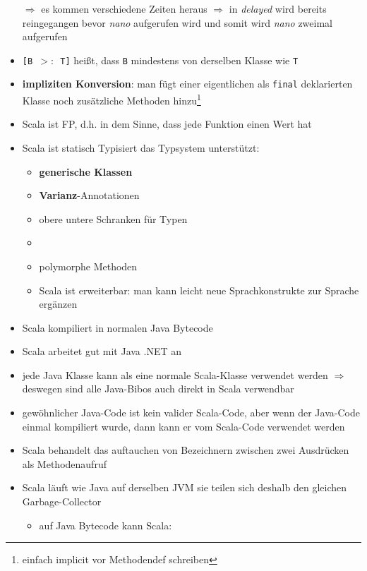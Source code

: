 \begin{itemize}
  
  
  $\Rightarrow$ es kommen verschiedene Zeiten heraus $\Rightarrow$ in
  \textit{delayed} wird bereits reingegangen bevor \textit{nano} 
  aufgerufen wird und somit wird \textit{nano} zweimal aufgerufen
  \item \texttt{[B $>:$ T]} heißt, dass \texttt{B} mindestens von derselben
  Klasse wie \texttt{T}
  \item \textbf{impliziten Konversion}: man fügt einer eigentlichen als 
  \texttt{final} deklarierten Klasse noch
  zusätzliche Methoden hinzu\footnote{einfach implicit vor Methodendef
  schreiben}
  \item Scala ist FP, d.h. in dem Sinne, dass jede Funktion einen Wert hat
  \item Scala ist statisch Typisiert \und das Typsystem unterstützt:
  \begin{itemize}
    \item \textbf{generische Klassen}
    \item \textbf{Varianz}-Annotationen
    \item obere \und untere Schranken für Typen
    \item {}
    \item polymorphe Methoden
    \item Scala ist erweiterbar: man kann leicht neue Sprachkonstrukte
    zur Sprache ergänzen
  \end{itemize}
  \item Scala kompiliert in normalen Java Bytecode
  \item Scala arbeitet gut mit Java \und .NET an
  \item jede Java Klasse kann als eine normale Scala-Klasse verwendet werden
  $\Rightarrow$ deswegen sind alle Java-Bibos auch direkt in Scala verwendbar
  \item gewöhnlicher Java-Code ist kein valider Scala-Code, aber wenn der
  Java-Code einmal kompiliert wurde, dann kann er vom Scala-Code verwendet
  werden
  \item Scala behandelt das auftauchen von Bezeichnern zwischen zwei
  Ausdrücken als Methodenaufruf
  \item Scala läuft wie Java auf derselben JVM \und sie teilen sich deshalb
  den gleichen Garbage-Collector
  \begin{itemize}
    \item auf Java Bytecode kann Scala:
    \begin{itemize}

\end{itemize}
\end{itemize}
\end{itemize}
